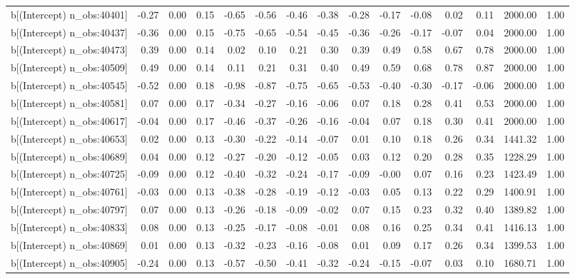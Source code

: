 \begin{table}[ht]
\begin{tabular}{rrrrrrrrrrrrrrr}
  b[(Intercept) n\_obs:40401] & -0.27 & 0.00 & 0.15 & -0.65 & -0.56 & -0.46 & -0.38 & -0.28 & -0.17 & -0.08 & 0.02 & 0.11 & 2000.00 & 1.00 \\ 
  b[(Intercept) n\_obs:40437] & -0.36 & 0.00 & 0.15 & -0.75 & -0.65 & -0.54 & -0.45 & -0.36 & -0.26 & -0.17 & -0.07 & 0.04 & 2000.00 & 1.00 \\ 
  b[(Intercept) n\_obs:40473] & 0.39 & 0.00 & 0.14 & 0.02 & 0.10 & 0.21 & 0.30 & 0.39 & 0.49 & 0.58 & 0.67 & 0.78 & 2000.00 & 1.00 \\ 
  b[(Intercept) n\_obs:40509] & 0.49 & 0.00 & 0.14 & 0.11 & 0.21 & 0.31 & 0.40 & 0.49 & 0.59 & 0.68 & 0.78 & 0.87 & 2000.00 & 1.00 \\ 
  b[(Intercept) n\_obs:40545] & -0.52 & 0.00 & 0.18 & -0.98 & -0.87 & -0.75 & -0.65 & -0.53 & -0.40 & -0.30 & -0.17 & -0.06 & 2000.00 & 1.00 \\ 
  b[(Intercept) n\_obs:40581] & 0.07 & 0.00 & 0.17 & -0.34 & -0.27 & -0.16 & -0.06 & 0.07 & 0.18 & 0.28 & 0.41 & 0.53 & 2000.00 & 1.00 \\ 
  b[(Intercept) n\_obs:40617] & -0.04 & 0.00 & 0.17 & -0.46 & -0.37 & -0.26 & -0.16 & -0.04 & 0.07 & 0.18 & 0.30 & 0.41 & 2000.00 & 1.00 \\ 
  b[(Intercept) n\_obs:40653] & 0.02 & 0.00 & 0.13 & -0.30 & -0.22 & -0.14 & -0.07 & 0.01 & 0.10 & 0.18 & 0.26 & 0.34 & 1441.32 & 1.00 \\ 
  b[(Intercept) n\_obs:40689] & 0.04 & 0.00 & 0.12 & -0.27 & -0.20 & -0.12 & -0.05 & 0.03 & 0.12 & 0.20 & 0.28 & 0.35 & 1228.29 & 1.00 \\ 
  b[(Intercept) n\_obs:40725] & -0.09 & 0.00 & 0.12 & -0.40 & -0.32 & -0.24 & -0.17 & -0.09 & -0.00 & 0.07 & 0.16 & 0.23 & 1423.49 & 1.00 \\ 
  b[(Intercept) n\_obs:40761] & -0.03 & 0.00 & 0.13 & -0.38 & -0.28 & -0.19 & -0.12 & -0.03 & 0.05 & 0.13 & 0.22 & 0.29 & 1400.91 & 1.00 \\ 
  b[(Intercept) n\_obs:40797] & 0.07 & 0.00 & 0.13 & -0.26 & -0.18 & -0.09 & -0.02 & 0.07 & 0.15 & 0.23 & 0.32 & 0.40 & 1389.82 & 1.00 \\ 
  b[(Intercept) n\_obs:40833] & 0.08 & 0.00 & 0.13 & -0.25 & -0.17 & -0.08 & -0.01 & 0.08 & 0.16 & 0.25 & 0.34 & 0.41 & 1416.13 & 1.00 \\ 
  b[(Intercept) n\_obs:40869] & 0.01 & 0.00 & 0.13 & -0.32 & -0.23 & -0.16 & -0.08 & 0.01 & 0.09 & 0.17 & 0.26 & 0.34 & 1399.53 & 1.00 \\ 
  b[(Intercept) n\_obs:40905] & -0.24 & 0.00 & 0.13 & -0.57 & -0.50 & -0.41 & -0.32 & -0.24 & -0.15 & -0.07 & 0.03 & 0.10 & 1680.71 & 1.00 \\ 

\end{tabular}
\end{table}
